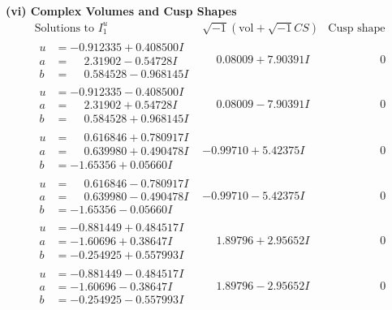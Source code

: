 \documentclass[1p]{elsarticle_modified}
\theoremstyle{definition}
\newcommand{\I}{\sqrt{-1}}
\begin{document}
\newpage\flushleft \textbf{(vi) Complex Volumes and Cusp Shapes}
$$\begin{array}{c|c|c}  
\text{Solutions to }I^u_{1}& \I (\text{vol} + \sqrt{-1}CS) & \text{Cusp shape}\\
 \hline 
\begin{aligned}
u &= -0.912335 + 0.408500 I \\
a &= \phantom{-}2.31902 - 0.54728 I \\
b &= \phantom{-}0.584528 - 0.968145 I\end{aligned}
 & \phantom{-}0.08009 + 7.90391 I & \phantom{-0.000000 } 0 \\ \hline\begin{aligned}
u &= -0.912335 - 0.408500 I \\
a &= \phantom{-}2.31902 + 0.54728 I \\
b &= \phantom{-}0.584528 + 0.968145 I\end{aligned}
 & \phantom{-}0.08009 - 7.90391 I & \phantom{-0.000000 } 0 \\ \hline\begin{aligned}
u &= \phantom{-}0.616846 + 0.780917 I \\
a &= \phantom{-}0.639980 + 0.490478 I \\
b &= -1.65356 + 0.05660 I\end{aligned}
 & -0.99710 + 5.42375 I & \phantom{-0.000000 } 0 \\ \hline\begin{aligned}
u &= \phantom{-}0.616846 - 0.780917 I \\
a &= \phantom{-}0.639980 - 0.490478 I \\
b &= -1.65356 - 0.05660 I\end{aligned}
 & -0.99710 - 5.42375 I & \phantom{-0.000000 } 0 \\ \hline\begin{aligned}
u &= -0.881449 + 0.484517 I \\
a &= -1.60696 + 0.38647 I \\
b &= -0.254925 + 0.557993 I\end{aligned}
 & \phantom{-}1.89796 + 2.95652 I & \phantom{-0.000000 } 0 \\ \hline\begin{aligned}
u &= -0.881449 - 0.484517 I \\
a &= -1.60696 - 0.38647 I \\
b &= -0.254925 - 0.557993 I\end{aligned}
 & \phantom{-}1.89796 - 2.95652 I & \phantom{-0.000000 } 0 \\ \hline\begin{aligned}

\end{aligned}
\end{array}$$
\end{document}
